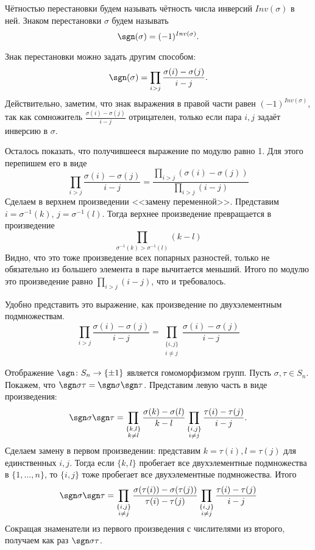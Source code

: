  Чётностью перестановки будем называть чётность числа инверсий $Inv(\sigma)$ в ней. Знаком перестановки $\sigma$ будем называть 
$$\sgn(\sigma)=(-1)^{Inv(\sigma)}.$$
\edfn

\rm Знак перестановки можно задать другим способом: 
$$\sgn(\sigma)= \prod_{i>j} \frac{\sigma(i)-\sigma(j)}{i-j}.$$
Действительно, заметим, что знак выражения в правой части равен $(-1)^{Inv (\sigma)}$, так как сомножитель $\frac{\sigma(i)-\sigma(j)}{i-j}$ отрицателен, только если пара $i,j$ задаёт инверсию в $\sigma$.

Осталось показать, что получившееся выражение по модулю равно 1. Для этого перепишем его в виде 
$$\prod_{i>j} \frac{\sigma(i)-\sigma(j)}{i-j}= \frac{\prod_{i>j} (\sigma(i)-\sigma(j))}{\prod_{i>j}(i-j)}
$$
Сделаем в верхнем произведении <<замену переменной>>. Представим $i=\sigma^{-1}(k)$, $j=\sigma^{-1}(l)$. Тогда верхнее произведение превращается в произведение 
$$\prod_{\sigma^{-1}(k)>\sigma^{-1}(l)} (k-l)$$
Видно, что это тоже произведение всех попарных разностей, только не обязательно из большего элемента в паре вычитается меньший. Итого по модулю это произведение равно $\prod_{i>j}(i-j)$, что  и требовалось.
\erm

\rm Удобно представить это выражение, как произведение по двухэлементным подмножествам.
$$\prod_{i>j} \frac{\sigma(i)-\sigma(j)}{i-j}=\prod_{\substack{\{i,j\}\\ i\neq j}} \frac{\sigma(i)-\sigma(j)}{i-j}$$
\erm
 

\lm Отображение $\sgn \colon S_n \to \{\pm 1\}$ является гомоморфизмом групп.
\elm
\proof Пусть $\sigma, \tau \in S_n$. Покажем, что $\sgn \sigma \tau = \sgn \sigma \sgn \tau$. Представим левую часть в виде произведения:
$$\sgn \sigma \sgn \tau= \prod_{\substack{\{k,l\}\\ k\neq l}} \frac{\sigma(k)-\sigma(l)}{k-l} \prod_{\substack{\{i,j\}\\ i\neq j}} \frac{\tau(i)-\tau(j)}{i-j}.$$
Сделаем замену в первом произведении: представим $k=\tau(i),l=\tau(j)$ для единственных $i,j$. Тогда если $\{k,l\}$ пробегает  все двухэлементные подмножества в $\{1,\dots,n\}$, то $\{i,j\}$ тоже пробегает все двухэлементные подмножества. Итого
$$\sgn \sigma \sgn \tau=\prod_{\substack{\{i,j\}\\ i\neq j}} \frac{\sigma(\tau(i))-\sigma(\tau(j))}{\tau(i)-\tau(j)} \prod_{\substack{\{i,j\}\\ i\neq j}} \frac{\tau(i)-\tau(j)}{i-j}$$
Сокращая знаменатели из первого произведения с числителями из второго, получаем как раз $\sgn \sigma \tau$.
\endproof

